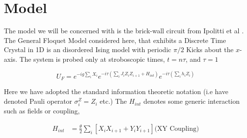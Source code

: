 \section{Model}

The model we will be concerned with is the brick-wall circuit from Ipolitti et al \cite{ippolitti2022time}. The General Floquet Model considered here, that exhibits a Discrete Time Crystal in 1D is an disordered Ising model with periodic $\pi/2$ Kicks about the $x$-axis. The system is probed only at stroboscopic times, $t=n \tau$, and $\tau=1$

\begin{equation}
    U_F= e^{-ig\sum_i X_i}e^{-i\tau(\sum_{i} J_{i} Z_i Z_{i+1}+H_{int})}e^{-i\tau(\sum_{i} h_{i} Z_i)}
\end{equation}

Here we have adopted the standard information theoretic notation (i.e have denoted Pauli operator $\sigma^Z_i=Z_i$ etc.) The $H_{int}$ denotes some generic interaction such as fields or coupling, 

\begin{equation*}
\begin{split}
    H_{int}&=  \frac{\theta}{2}\sum_{i}[X_iX_{i+1}+Y_iY_{i+1}] \text{(XY Coupling)}
\end{split}
\end{equation*}


